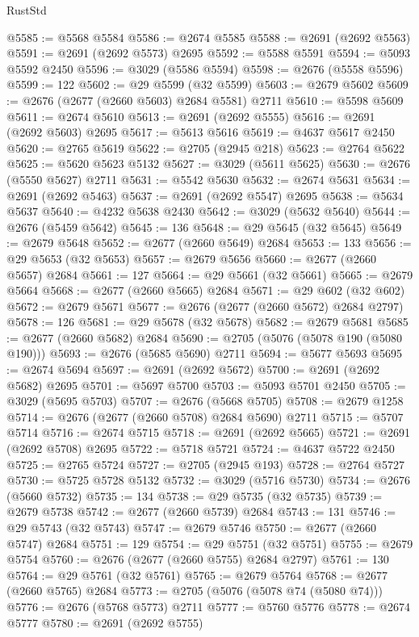 \begin{lexlean}{RustStd}
\begin{coremodule}
@5585 := @5568 @5584
@5586 := @2674 @5585
@5588 := @2691 (@2692 @5563)
@5591 := @2691 (@2692 @5573) @2695
@5592 := @5588 @5591
@5594 := @5093 @5592 @2450
@5596 := @3029 (@5586 @5594)
@5598 := @2676 (@5558 @5596)
@5599 := 122
@5602 := @29 @5599 (@32 @5599)
@5603 := @2679 @5602
@5609 := @2676 (@2677 (@2660 @5603) @2684 @5581) @2711
@5610 := @5598 @5609
@5611 := @2674 @5610
@5613 := @2691 (@2692 @5555)
@5616 := @2691 (@2692 @5603) @2695
@5617 := @5613 @5616
@5619 := @4637 @5617 @2450
@5620 := @2765 @5619
@5622 := @2705 (@2945 @218)
@5623 := @2764 @5622
@5625 := @5620 @5623 @5132
@5627 := @3029 (@5611 @5625)
@5630 := @2676 (@5550 @5627) @2711
@5631 := @5542 @5630
@5632 := @2674 @5631
@5634 := @2691 (@2692 @5463)
@5637 := @2691 (@2692 @5547) @2695
@5638 := @5634 @5637
@5640 := @4232 @5638 @2430
@5642 := @3029 (@5632 @5640)
@5644 := @2676 (@5459 @5642)
@5645 := 136
@5648 := @29 @5645 (@32 @5645)
@5649 := @2679 @5648
@5652 := @2677 (@2660 @5649) @2684
@5653 := 133
@5656 := @29 @5653 (@32 @5653)
@5657 := @2679 @5656
@5660 := @2677 (@2660 @5657) @2684
@5661 := 127
@5664 := @29 @5661 (@32 @5661)
@5665 := @2679 @5664
@5668 := @2677 (@2660 @5665) @2684
@5671 := @29 @602 (@32 @602)
@5672 := @2679 @5671
@5677 := @2676 (@2677 (@2660 @5672) @2684 @2797)
@5678 := 126
@5681 := @29 @5678 (@32 @5678)
@5682 := @2679 @5681
@5685 := @2677 (@2660 @5682) @2684
@5690 := @2705 (@5076 (@5078 @190 (@5080 @190)))
@5693 := @2676 (@5685 @5690) @2711
@5694 := @5677 @5693
@5695 := @2674 @5694
@5697 := @2691 (@2692 @5672)
@5700 := @2691 (@2692 @5682) @2695
@5701 := @5697 @5700
@5703 := @5093 @5701 @2450
@5705 := @3029 (@5695 @5703)
@5707 := @2676 (@5668 @5705)
@5708 := @2679 @1258
@5714 := @2676 (@2677 (@2660 @5708) @2684 @5690) @2711
@5715 := @5707 @5714
@5716 := @2674 @5715
@5718 := @2691 (@2692 @5665)
@5721 := @2691 (@2692 @5708) @2695
@5722 := @5718 @5721
@5724 := @4637 @5722 @2450
@5725 := @2765 @5724
@5727 := @2705 (@2945 @193)
@5728 := @2764 @5727
@5730 := @5725 @5728 @5132
@5732 := @3029 (@5716 @5730)
@5734 := @2676 (@5660 @5732)
@5735 := 134
@5738 := @29 @5735 (@32 @5735)
@5739 := @2679 @5738
@5742 := @2677 (@2660 @5739) @2684
@5743 := 131
@5746 := @29 @5743 (@32 @5743)
@5747 := @2679 @5746
@5750 := @2677 (@2660 @5747) @2684
@5751 := 129
@5754 := @29 @5751 (@32 @5751)
@5755 := @2679 @5754
@5760 := @2676 (@2677 (@2660 @5755) @2684 @2797)
@5761 := 130
@5764 := @29 @5761 (@32 @5761)
@5765 := @2679 @5764
@5768 := @2677 (@2660 @5765) @2684
@5773 := @2705 (@5076 (@5078 @74 (@5080 @74)))
@5776 := @2676 (@5768 @5773) @2711
@5777 := @5760 @5776
@5778 := @2674 @5777
@5780 := @2691 (@2692 @5755)

\end{coremodule}
\end{lexlean}
